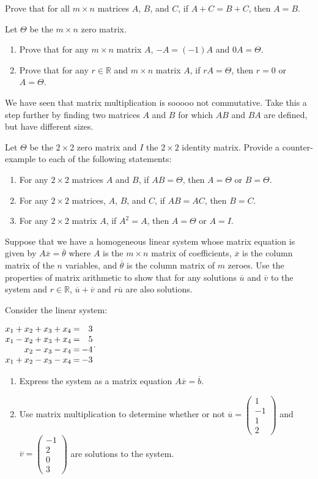 \documentclass[12pt]{article}
\makeatletter
\def\it{\item}
\def\be{\begin{enumerate}} \def\ee{\end{enumerate}}
\def\bc{\begin{center}} \def\ec{\end{center}}
\def\lp{\left(} \def\rp{\right)} \def\abs#1{\vert #1 \vert}
\def\bar#1{\overline{#1}}
\def\th{\theta} \def\al{\alpha} \def\ba{\beta} \def\ga{\gamma}
\def\R{\mathbb{R}} \def\Q{\mathbb{Q}} \def\N{\mathbb{N}} \def\Z{\mathbb{Z}} \def\P{\mathbb{P}}
\newenvironment{linsys}[2][m]{%
\setlength{\arraycolsep}{.1111em} %
\begin{array}[#1]{@{}*{#2}{rc}r@{}} 
}{%
\end{array}}
\makeatother
\begin{document}
\it Prove that for all $m \times n$ matrices $A$, $B$, and $C$, 
	if $A + C = B + C$, then $A = B$.

\it Let $\Theta$ be the $m \times n$ zero matrix.
	\be
	\it Prove that for any $m \times n$ matrix $A$, $-A = (-1)A$ and 
		$0A = \Theta$.
	\it Prove that for any $r \in \R$ and $m \times n$ matrix $A$, 
		if $rA = \Theta$, then $r = 0$ or $A = \Theta$.
	\ee

\it We have seen that matrix multiplication is sooooo not commutative. Take this a
	step further by finding two matrices $A$ and $B$ for which $AB$ and $BA$ are defined, but have different sizes.

\it Let $\Theta$ be the $2 \times 2$ zero matrix and $I$ the $2 \times 2$
	identity matrix. Provide a counter-example to each of the following statements:
	\be
	\it For any $2 \times 2$ matrices $A$ and $B$, if $AB = \Theta$, 
		then $A = \Theta$ or $B = \Theta$.
	\it For any $2 \times 2$ matrices, $A$, $B$, and $C$, if $AB = AC$, 
		then $B = C$.
	\it For any $2 \times 2$ matrix $A$, if $A^2 = A$, 
		then $A = \Theta$ or $A = I$.
	\ee

\it Suppose that we have a homogeneous linear system whose matrix
	equation is given by $A\bar{x} = \bar{\th}$ where $A$ is the $m \times n$ matrix of coefficients, $\bar{x}$ is the column matrix of the $n$ variables, and $\bar{\th}$ is the column matrix of $m$ zeroes. Use the properties of matrix arithmetic to show that for any solutions $\bar{u}$ and $\bar{v}$ to the system and $r \in \R$, $\bar{u} + \bar{v}$ and $r\bar{u}$ are also solutions.

\it Consider the linear system:  
	\bc
	$\begin{linsys}{4}
	x_1 &+ &x_2 &+ &x_3 &+ &x_4 &= &3 \\
	x_1 &- &x_2 &+ &x_3 &+ &x_4 &= &5 \\
	\   &\ &x_2 &- &x_3 &- &x_4 &= &-4 \\
	x_1 &+ &x_2 &- &x_3 &- &x_4 &= &-3
	\end{linsys}$.
	\ec
	\be
	\it Express the system as a matrix equation $A\bar{x} = \bar{b}$.
	\it Use matrix multiplication to determine whether or not 
		$\bar{u} = \lp \begin{array}{r} 1 \\ -1 \\ 1 \\ 2 \end{array} \rp$ and $\bar{v} = \lp \begin{array}{r} -1 \\ 2 \\ 0 \\ 3 \end{array} \rp$ are solutions to the system.
	\ee
\end{document}
